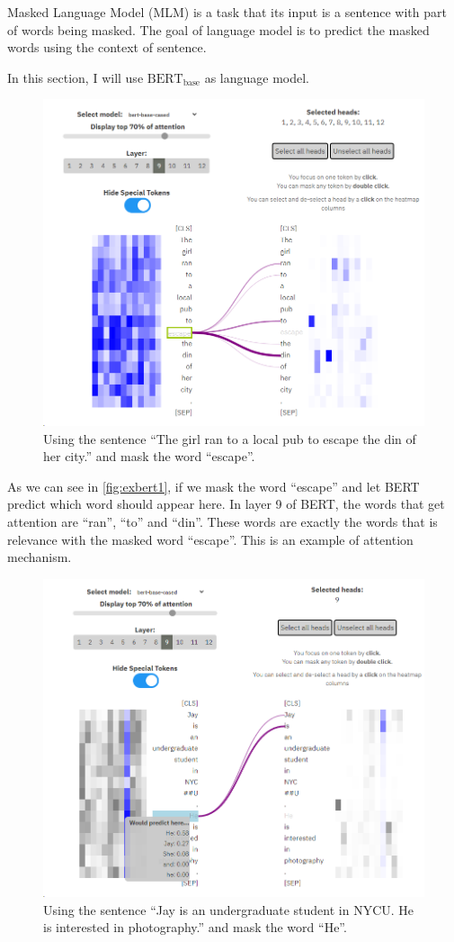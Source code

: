 \documentclass{article}[12pt]
\begin{document}
Masked Language Model (MLM) is a task that its input is a sentence with part of words being masked. The goal of language model is to predict the masked words using the context of 
sentence. 

In this section, I will use $\text{BERT}_{\text{base}}$ as language model.

\begin{figure}[htbp]
	\centering
	\includegraphics[width=0.7\linewidth]{figure/exbert1}
	\caption{Using the sentence ``The girl ran to a local pub to escape the din of her city.'' and mask the word ``escape''.}
	\label{fig:exbert1}
\end{figure}

As we can see in \autoref{fig:exbert1}, if we mask the word ``escape'' and let BERT predict which word should appear here. In layer 9 of BERT, the words that get attention are ``ran'', ``to'' and ``din''.  These words are exactly the words that is relevance with the masked word ``escape''. This is an example of attention mechanism.


\begin{figure}[htbp]
	\centering
	\includegraphics[width=0.7\linewidth]{figure/exbert2}
	\caption{Using the sentence ``Jay is an undergraduate student in NYCU. He is interested in photography.'' and mask the word ``He''.}
	\label{fig:exbert2}
\end{figure}
\end{document}
